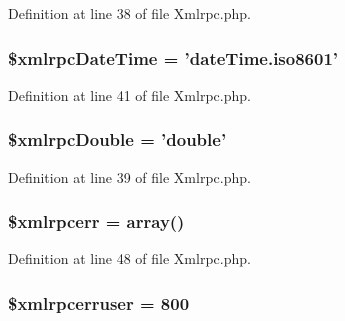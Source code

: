 Definition at line 38 of file Xmlrpc.\-php.

\hypertarget{class_c_i___xmlrpc_ad0ef2c8353643b73afe4636a5fb84cff}{
\subsubsection[{\$xmlrpc\-Date\-Time}]{\setlength{\rightskip}{0pt plus 5cm}\$xmlrpc\-Date\-Time = 'date\-Time.\-iso8601'}}\label{class_c_i___xmlrpc_ad0ef2c8353643b73afe4636a5fb84cff}


Definition at line 41 of file Xmlrpc.\-php.

\hypertarget{class_c_i___xmlrpc_aa412c6bea7572d0e508b5ef9d2213db3}{
\subsubsection[{\$xmlrpc\-Double}]{\setlength{\rightskip}{0pt plus 5cm}\$xmlrpc\-Double = 'double'}}\label{class_c_i___xmlrpc_aa412c6bea7572d0e508b5ef9d2213db3}


Definition at line 39 of file Xmlrpc.\-php.

\hypertarget{class_c_i___xmlrpc_a915a90a791db11a94f665567d2f5ad01}{
\subsubsection[{\$xmlrpcerr}]{\setlength{\rightskip}{0pt plus 5cm}\$xmlrpcerr = array()}}\label{class_c_i___xmlrpc_a915a90a791db11a94f665567d2f5ad01}


Definition at line 48 of file Xmlrpc.\-php.

\hypertarget{class_c_i___xmlrpc_a45bf41f1e861f94e04f463a638e5abf5}{
\subsubsection[{\$xmlrpcerruser}]{\setlength{\rightskip}{0pt plus 5cm}\$xmlrpcerruser = 800}}\label{class_c_i___xmlrpc_a45bf41f1e861f94e04f463a638e5abf5}


